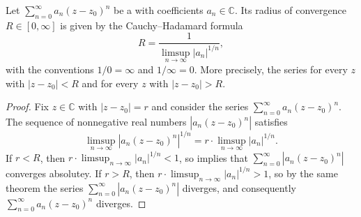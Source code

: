 \begin{proposition} \label{proposition:cauchy_hadamard_formula_for_power_series_in_one_complex_variable}
    Let $\sum_{n=0}^\infty a_n (z - z_0)^n$ be a  with coefficients $a_n \in \mathbb{C}$. Its radius of convergence $R \in [0, \infty]$ is given by the Cauchy--Hadamard formula
    $$R = \frac{1}{\limsup_{n \to \infty} |a_n|^{1/n}},$$
    with the conventions $1/0 = \infty$ and $1/\infty = 0$. More precisely, the series  for every $z$ with $|z - z_0| < R$ and  for every $z$ with $|z - z_0| > R$.
\end{proposition}

\begin{proof}
    Fix $z \in \mathbb{C}$ with $|z - z_0| = r$ and consider the series $\sum_{n=0}^\infty a_n (z - z_0)^n$. The sequence of nonnegative real numbers $|a_n (z - z_0)^n|$ satisfies
    $$\limsup_{n \to \infty} |a_n (z - z_0)^n|^{1/n} = r \cdot \limsup_{n \to \infty} |a_n|^{1/n}.$$
    If $r < R$, then $r \cdot \limsup_{n \to \infty} |a_n|^{1/n} < 1$, so  implies that $\sum_{n=0}^\infty |a_n (z - z_0)^n|$ converges absolutey. If $r > R$, then $r \cdot \limsup_{n \to \infty} |a_n|^{1/n} > 1$, so by the same theorem the series $\sum_{n=0}^\infty |a_n (z - z_0)^n|$ diverges, and consequently $\sum_{n=0}^\infty a_n (z - z_0)^n$ diverges.
\end{proof}
